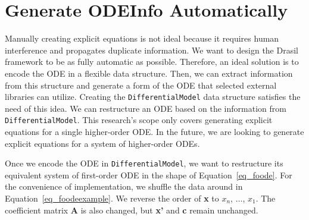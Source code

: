 \section{Generate ODEInfo Automatically}
Manually creating explicit equations is not ideal because it requires human interference and propagates duplicate information. We want to design the Drasil framework to be as fully automatic as possible. Therefore, an ideal solution is to encode the ODE in a flexible data structure. Then, we can extract information from this structure and generate a form of the ODE that selected external libraries can utilize. Creating the \verb|DifferentialModel| data structure satisfies the need of this idea. We can restructure an ODE based on the information from \verb|DifferentialModel|. This research's scope only covers generating explicit equations for a single higher-order ODE. In the future, we are looking to generate explicit equations for a system of higher-order ODEs.

Once we encode the ODE in \verb|DifferentialModel|, we want to restructure its equivalent system of first-order ODE in the shape of Equation~\ref{eq_foode}. For the convenience of implementation, we shuffle the data around in Equation~\ref{eq_foodeexample}. We reverse the order of \textbf{x} to $x_{n}$, $\dots$, $x_{1}$. The coefficient matrix \textbf{A} is also changed, but \textbf{x'} and \textbf{c} remain unchanged.

